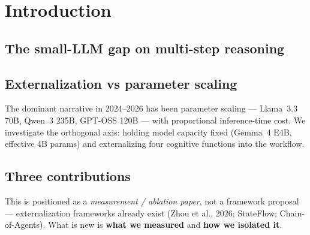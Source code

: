 \documentclass[11pt]{article}
\begin{document}
\section{Introduction}

\subsection{The small-LLM gap on multi-step reasoning}

\subsection{Externalization vs parameter scaling}
The dominant narrative in 2024--2026 has been parameter scaling --- Llama~3.3 70B, Qwen~3 235B, GPT-OSS 120B --- with proportional inference-time cost. We investigate the orthogonal axis: holding model capacity fixed (Gemma~4 E4B, effective 4B params) and externalizing four cognitive functions into the workflow.

\subsection{Three contributions}
This is positioned as a \emph{measurement / ablation paper}, not a framework proposal --- externalization frameworks already exist (Zhou et al., 2026; StateFlow; Chain-of-Agents). What is new is \textbf{what we measured} and \textbf{how we isolated it}.
\end{document}
